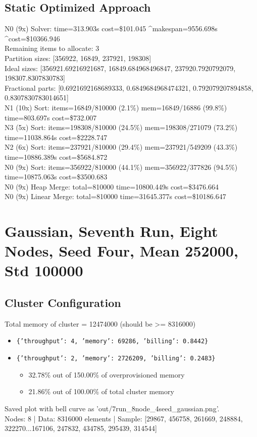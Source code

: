 \documentclass[]{interact}
\theoremstyle{plain}
\theoremstyle{definition}
\theoremstyle{remark}
\begin{document}
\subsection{Static Optimized Approach}
N0 (9x) Solver: time=313.903\textmu s cost=\$101.045 \^{}makespan=9556.698\textmu s \^{}cost=\$10366.946\\
Remaining items to allocate: 3\\
Partition sizes: [356922, 16849, 237921, 198308]\\
Ideal sizes: [356921.69216921687, 16849.684968496847, 237920.7920792079, 198307.8307830783]\\
Fractional parts: [0.6921692168689333, 0.6849684968474321, 0.792079207894858, 0.8307830783014651]\\
N1 (10x) Sort: items=16849/810000 (2.1\%) mem=16849/16886 (99.8\%) time=803.697\textmu s cost=\$732.007\\
N3 (5x) Sort: items=198308/810000 (24.5\%) mem=198308/271079 (73.2\%) time=11038.864\textmu s cost=\$2228.747\\
N2 (6x) Sort: items=237921/810000 (29.4\%) mem=237921/549209 (43.3\%) time=10886.389\textmu s cost=\$5684.872\\
N0 (9x) Sort: items=356922/810000 (44.1\%) mem=356922/377826 (94.5\%) time=10875.063\textmu s cost=\$3500.683\\
N0 (9x) Heap Merge: total=810000 time=10800.449\textmu s cost=\$3476.664\\
N0 (9x) Linear Merge: total=810000 time=31645.377\textmu s cost=\$10186.647

\clearpage

\section{Gaussian, Seventh Run, Eight Nodes, Seed Four, Mean 252000, Std 100000}

\subsection{Cluster Configuration}
Total memory of cluster = 12474000 (should be >= 8316000)
\begin{itemize}
    \item \texttt{\{'throughput': 4, 'memory': 69286, 'billing': 0.8442\}}
    \item \texttt{\{'throughput': 2, 'memory': 2726209, 'billing': 0.2483\}}
    \begin{itemize}
        \item 32.78\% out of 150.00\% of overprovisioned memory
        \item 21.86\% out of 100.00\% of total cluster memory
    \end{itemize}
\end{itemize}
Saved plot with bell curve as 'out/7run\_8node\_4seed\_gaussian.png'.\\
Nodes: 8 | Data: 8316000 elements | Sample: [29867, 456758, 261669, 248884, 322270...167106, 247832, 434785, 295439, 314544]
\end{document}

